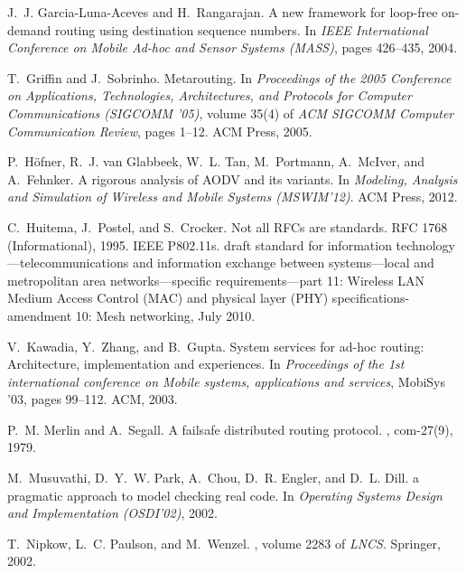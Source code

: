\documentclass[letterpaper]{sig-alternate-pages}
\begin{document}
\begin{thebibliography}{10}
J.~J. Garcia-Luna-Aceves and H.~Rangarajan.
\newblock A new framework for loop-free on-demand routing using destination
  sequence numbers.
\newblock In {\em IEEE International Conference on Mobile Ad-hoc and Sensor
  Systems (MASS)}, pages 426--435, 2004.

T.~Griffin and J.~Sobrinho.
\newblock Metarouting.
\newblock In {\em Proceedings of the 2005 Conference on Applications,
  Technologies, Architectures, and Protocols for Computer Communications
  (SIGCOMM '05)}, volume 35(4) of {\em ACM SIGCOMM Computer Communication
  Review}, pages 1--12. ACM Press, 2005.

P.~H{\"o}fner, R.~J. van Glabbeek, W.~L. Tan, M.~Portmann, A.~McIver, and
  A.~Fehnker.
\newblock A rigorous analysis of {AODV} and its variants.
\newblock In {\em Modeling, Analysis and Simulation of Wireless and Mobile
  Systems (MSWIM'12)}. ACM Press, 2012.

C.~Huitema, J.~Postel, and S.~Crocker.
\newblock Not all {RFC}s are standards.
\newblock RFC 1768 (Informational), 1995.
 \vfill\eject {}
{IEEE P802.11s}.
 draft standard for information technology---telecommunications
  and information exchange between systems---local and metropolitan area
  networks---specific requirements---part 11: Wireless {LAN} {M}edium {A}ccess
  {C}ontrol {(MAC)} and physical layer {(PHY)} specifications-amendment 10:
  Mesh networking, July 2010.

V.~Kawadia, Y.~Zhang, and B.~Gupta.
\newblock System services for ad-hoc routing: Architecture, implementation and
  experiences.
\newblock In {\em Proceedings of the 1st international conference on Mobile
  systems, applications and services}, MobiSys '03, pages 99--112. ACM, 2003.

P.~M. Merlin and A.~Segall.
\newblock A failsafe distributed routing protocol.
, com-27(9), 1979.

M.~Musuvathi, D.~Y.~W. Park, A.~Chou, D.~R. Engler, and D.~L. Dill.
 a pragmatic approach to model checking real code.
\newblock In {\em Operating Systems Design and Implementation (OSDI'02)}, 2002.

T.~Nipkow, L.~C. Paulson, and M.~Wenzel.
,
  volume 2283 of {\em LNCS}.
\newblock Springer, 2002.


\end{thebibliography}
\end{document}
